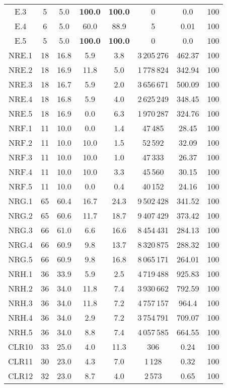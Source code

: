 {\begin{longtable}{@{\extracolsep{0pt}}cccccccc}
	E.3 & 5 & 5.0 & \textbf{100.0} & \textbf{100.0} & 0 & 0.0 & 100 \\
	E.4 & 6 & 5.0 & 60.0 & 88.9 & 5 & 0.01 & 100 \\
	E.5 & 5 & 5.0 & \textbf{100.0} & \textbf{100.0} & 0 & 0.0 & 100 \\
	NRE.1 & 18 & 16.8 & 5.9 & 3.8 & 3\,205\,276 & 462.37 & 100 \\
	NRE.2 & 18 & 16.9 & 11.8 & 5.0 & 1\,778\,824 & 342.94 & 100 \\
	NRE.3 & 18 & 16.7 & 5.9 & 2.0 & 3\,656\,671 & 500.09 & 100 \\
	NRE.4 & 18 & 16.8 & 5.9 & 4.0 & 2\,625\,249 & 348.45 & 100 \\
	NRE.5 & 18 & 16.9 & 0.0 & 6.3 & 1\,970\,287 & 324.76 & 100 \\
	NRF.1 & 11 & 10.0 & 0.0 & 1.4 & 47\,485 & 28.45 & 100 \\
	NRF.2 & 11 & 10.0 & 10.0 & 1.5 & 52\,592 & 32.09 & 100 \\
	NRF.3 & 11 & 10.0 & 10.0 & 1.0 & 47\,333 & 26.37 & 100 \\
	NRF.4 & 11 & 10.0 & 10.0 & 3.3 & 45\,560 & 30.15 & 100 \\
	NRF.5 & 11 & 10.0 & 0.0 & 0.4 & 40\,152 & 24.16 & 100 \\
	NRG.1 & 65 & 60.4 & 16.7 & 24.3 & 9\,502\,428 & 341.52 & 100 \\
	NRG.2 & 65 & 60.6 & 11.7 & 18.7 & 9\,407\,429 & 373.42 & 100 \\
	NRG.3 & 66 & 61.0 & 6.6 & 16.6 & 8\,454\,431 & 284.13 & 100 \\
	NRG.4 & 66 & 60.9 & 9.8 & 13.7 & 8\,320\,875 & 288.32 & 100 \\
	NRG.5 & 66 & 60.9 & 9.8 & 16.8 & 8\,065\,171 & 264.01 & 100 \\
	NRH.1 & 36 & 33.9 & 5.9 & 2.5 & 4\,719\,488 & 925.83 & 100 \\
	NRH.2 & 36 & 34.0 & 11.8 & 7.4 & 3\,930\,662 & 792.59 & 100 \\
	NRH.3 & 36 & 34.0 & 11.8 & 7.2 & 4\,757\,157 & 964.4 & 100 \\
	NRH.4 & 36 & 34.0 & 2.9 & 7.2 & 3\,754\,791 & 709.07 & 100 \\
	NRH.5 & 36 & 34.0 & 8.8 & 7.4 & 4\,057\,585 & 664.55 & 100 \\
	CLR10 & 33 & 25.0 & 4.0 & 11.3 & 306 & 0.24 & 100 \\
	CLR11 & 30 & 23.0 & 4.3 & 7.0 & 1\,128 & 0.32 & 100 \\
	CLR12 & 32 & 23.0 & 8.7 & 4.0 & 2\,573 & 0.65 & 100 \\

\end{longtable}}
